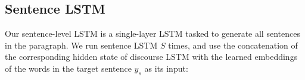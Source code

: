 \documentclass[11pt,a4paper]{article}
\begin{document}


\subsection{Sentence LSTM}
Our sentence-level LSTM is a single-layer LSTM tasked to generate all sentences in the paragraph.
We run sentence LSTM $S$ times, and use the concatenation of the corresponding hidden state of discourse LSTM with the learned embeddings of the words in the target sentence $y_s$ as its input:
\end{document}
